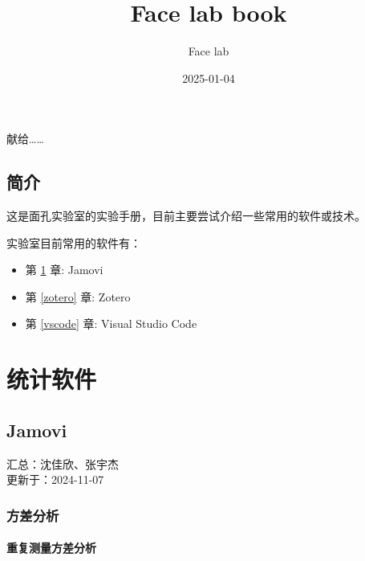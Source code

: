 \documentclass[]{ctexbook}
\title{Face lab book}
\author{Face lab}
\date{2025-01-04}
\providecommand{\tightlist}{%
  \setlength{\itemsep}{0pt}\setlength{\parskip}{0pt}}
\theoremstyle{definition}
\theoremstyle{definition}
\theoremstyle{definition}
\theoremstyle{definition}
\theoremstyle{remark}
\begin{document}
\maketitle


\thispagestyle{empty}

\begin{center}
献给……

\end{center}

\setlength{\abovedisplayskip}{-5pt}
\setlength{\abovedisplayshortskip}{-5pt}

{
\setcounter{tocdepth}{2}
\tableofcontents
}
\listoftables
\listoffigures
\chapter{简介}\label{ux7b80ux4ecb}

这是面孔实验室的实验手册，目前主要尝试介绍一些常用的软件或技术。

实验室目前常用的软件有：

\begin{itemize}
\tightlist
\item
  第 \ref{jamovi} 章: Jamovi\\
\item
  第 \ref{zotero} 章: Zotero
\item
  第 \ref{vscode} 章: Visual Studio Code
\end{itemize}

\mainmatter

\part{统计软件}\label{part-ux7edfux8ba1ux8f6fux4ef6}

\chapter{Jamovi}\label{jamovi}

汇总：沈佳欣、张宇杰\\
更新于：2024-11-07

\section{方差分析}\label{ux65b9ux5deeux5206ux6790}

\subsection{重复测量方差分析}\label{ux91cdux590dux6d4bux91cfux65b9ux5deeux5206ux6790}
\end{document}

